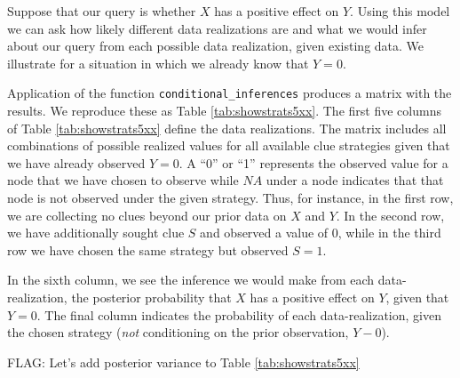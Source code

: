 \documentclass[
  12pt,
]{book}
\begin{document}
Suppose that our query is whether \(X\) has a positive effect on \(Y\). Using this model we can ask how likely different data realizations are and what we would infer about our query from each possible data realization, given existing data. We illustrate for a situation in which we already know that \(Y=0\).

Application of the function \texttt{conditional\_inferences} produces a matrix with the results. We reproduce these as Table \ref{tab:showstrats5xx}. The first five columns of Table \ref{tab:showstrats5xx} define the data realizations. The matrix includes all combinations of possible realized values for all available clue strategies given that we have already observed \(Y=0\). A ``0'' or ``1'' represents the observed value for a node that we have chosen to observe while \(NA\) under a node indicates that that node is not observed under the given strategy. Thus, for instance, in the first row, we are collecting no clues beyond our prior data on \(X\) and \(Y\). In the second row, we have additionally sought clue \(S\) and observed a value of \(0\), while in the third row we have chosen the same strategy but observed \(S=1\).

In the sixth column, we see the inference we would make from each data-realization, the posterior probability that \(X\) has a positive effect on \(Y\), given that \(Y=0\). The final column indicates the probability of each data-realization, given the chosen strategy (\emph{not} conditioning on the prior observation, \(Y-0\)).

FLAG: Let's add posterior variance to Table \ref{tab:showstrats5xx}
\end{document}
